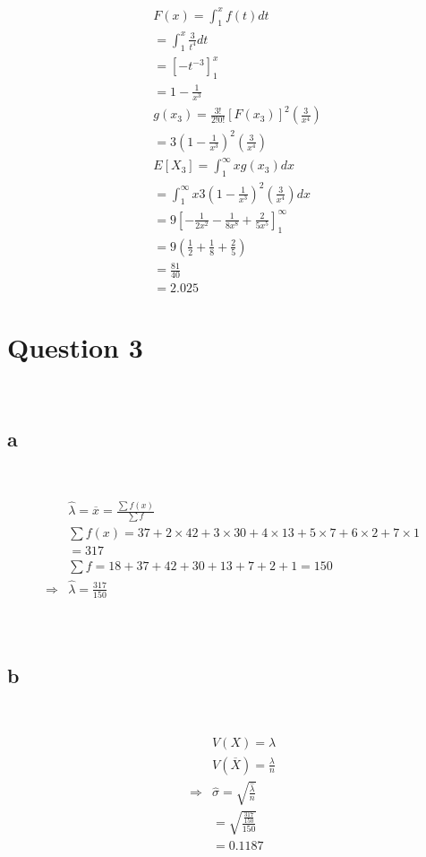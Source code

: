 \documentclass{article}
\begin{document}
\begin{align*}
    &F(x)=\int_{1}^{x}f(t)dt\\
    &=\int_{1}^{x}\frac{3}{t^4}dt\\
    &=\left[-t^{-3}\right]^x_1\\
    &=1-\frac{1}{x^3}\\
    &g(x_3)=\frac{3!}{2!0!}[F(x_3)]^2(\frac{3}{x^4})\\
    &=3(1-\frac{1}{x^3})^2(\frac{3}{x^4})\\
    &E[X_3]=\int_{1}^{\infty}xg(x_3)dx\\
    &=\int_{1}^{\infty}x3(1-\frac{1}{x^3})^2(\frac{3}{x^4})dx\\
    &=9\left[-\frac{1}{2x^2}-\frac{1}{8x^8}+\frac{2}{5x^5}\right]^\infty_1\\
    &=9(\frac{1}{2}+\frac{1}{8}+\frac{2}{5})\\
    &=\frac{81}{40}\\
    &=2.025
\end{align*}

\newpage

\section*{Question 3}

~

\subsection*{a}

~

\begin{align*}
    &\hat{\lambda}=\overline{x}=\frac{\sum f(x)}{\sum f}\\
    &\sum f(x)=37+2\times42+3\times30+4\times13+5\times7+6\times2+7\times1\\
    &=317\\
    &\sum f=18+37+42+30+13+7+2+1=150\\
    \Rightarrow&\hat{\lambda}=\frac{317}{150}\\
\end{align*}

~

\subsection*{b}

~

\begin{align*}
    &V(X)=\lambda\\
    &V(\overline{X})=\frac{\lambda}{n}\\
    \Rightarrow&\hat{\sigma}=\sqrt{\frac{\hat{\lambda}}{n}}\\
    &=\sqrt{\frac{\frac{317}{150}}{150}}\\
    &=0.1187\\
\end{align*}
\end{document}
